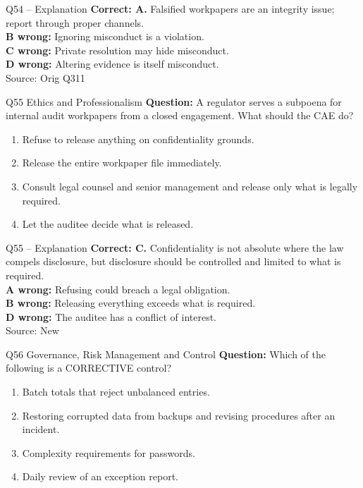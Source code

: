 \documentclass[aspectratio=169,10pt]{beamer}
\begin{document}
\begin{frame}[t]{Q54 -- Explanation}
	\footnotesize
	\textbf{Correct: A.} Falsified workpapers are an integrity issue; report through proper channels. \\[5pt]
\textbf{B wrong:} Ignoring misconduct is a violation. \\[3pt]
\textbf{C wrong:} Private resolution may hide misconduct. \\[3pt]
\textbf{D wrong:} Altering evidence is itself misconduct. \\[3pt]
	\vfill {\tiny Source: Orig Q311}
\end{frame}

\begin{frame}[t]{Q55 \hfill {\scriptsize Ethics and Professionalism}}
	\small
	\textbf{Question:} A regulator serves a subpoena for internal audit workpapers from a closed engagement. What should the CAE do?
	\begin{enumerate}[label=\Alph*.,itemsep=1pt,topsep=3pt]
			\item Refuse to release anything on confidentiality grounds.
			\item Release the entire workpaper file immediately.
			\item Consult legal counsel and senior management and release only what is legally required.
			\item Let the auditee decide what is released.
	\end{enumerate}
\end{frame}

\begin{frame}[t]{Q55 -- Explanation}
	\footnotesize
	\textbf{Correct: C.} Confidentiality is not absolute where the law compels disclosure, but disclosure should be controlled and limited to what is required. \\[5pt]
\textbf{A wrong:} Refusing could breach a legal obligation. \\[3pt]
\textbf{B wrong:} Releasing everything exceeds what is required. \\[3pt]
\textbf{D wrong:} The auditee has a conflict of interest. \\[3pt]
	\vfill {\tiny Source: New}
\end{frame}

\begin{frame}[t]{Q56 \hfill {\scriptsize Governance, Risk Management and Control}}
	\small
	\textbf{Question:} Which of the following is a CORRECTIVE control?
	\begin{enumerate}[label=\Alph*.,itemsep=1pt,topsep=3pt]
			\item Batch totals that reject unbalanced entries.
			\item Restoring corrupted data from backups and revising procedures after an incident.
			\item Complexity requirements for passwords.
			\item Daily review of an exception report.
	\end{enumerate}
\end{frame}
\end{document}
